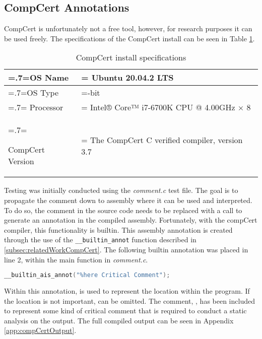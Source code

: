 \subsection{CompCert Annotations}
\label{subsec:compCert}
CompCert is unfortunately not a free tool, however, for research purposes it can be used freely. The specifications of the CompCert install can be seen in Table \ref{tab:compcertInstall}. 

\begin{table}
    \begin{center}
        \begin{tabularx}{\linewidth} { 
            | >{\hsize=.7\hsize\linewidth=\hsize}X 
            | >{\hsize=1.3\hsize\linewidth=\hsize}X  | }
            \hline
            OS Name & Ubuntu 20.04.2 LTS \\
            \hline
            OS Type & 64-bit \\
            \hline
            Processor & Intel® Core™ i7-6700K CPU @ 4.00GHz × 8 \\
            \hline
            \raggedright
            CompCert Version & The CompCert C verified compiler, version 3.7 \\
            \hline
        \end{tabularx}
    \end{center}
    \caption{CompCert install specifications}
    \label{tab:compcertInstall}
\end{table}

Testing was initially conducted using the \textit{comment.c} test file. The goal is to propagate the comment down to assembly where it can be used and interpreted. To do so, the comment in the source code needs to be replaced with a call to generate an annotation in the compiled assembly. Fortunately, with the compCert compiler, this functionality is builtin. This assembly annotation is created through the use of the \texttt{\_\_builtin\_annot} function described in \ref{subsec:relatedWorkCompCert}. The following builtin annotation was placed in line 2, within the main function in \textit{comment.c}.

\begin{lstlisting}[language=C]
__builtin_ais_annot("%here Critical Comment");
\end{lstlisting}

Within this annotation,  is used to represent the location within the program. If the location is not important,  can be omitted. The comment, , has been included to represent some kind of critical comment that is required to conduct a static analysis on the output. The full compiled output can be seen in Appendix \ref{app:compCertOutput}.

